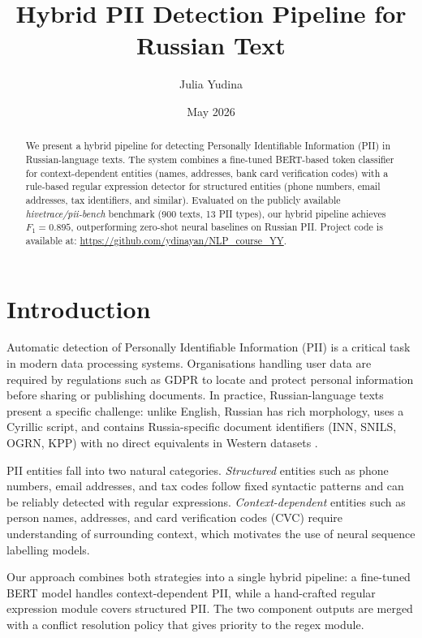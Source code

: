 \documentclass{article}
\title{Hybrid PII Detection Pipeline for Russian Text}
\author{Julia Yudina}
\date{May 2026}
\begin{document}
\maketitle

\begin{abstract}
We present a hybrid pipeline for detecting Personally Identifiable Information (PII) in Russian-language texts. The system combines a fine-tuned BERT-based token classifier for context-dependent entities (names, addresses, bank card verification codes) with a rule-based regular expression detector for structured entities (phone numbers, email addresses, tax identifiers, and similar). Evaluated on the publicly available \textit{hivetrace/pii-bench} benchmark (900 texts, 13 PII types), our hybrid pipeline achieves $F_1 = 0.895$, outperforming zero-shot neural baselines on Russian PII. Project code is available at: \url{https://github.com/ydinayan/NLP_course_YY}.
\end{abstract}

\section{Introduction}

Automatic detection of Personally Identifiable Information (PII) is a critical task in modern data processing systems. Organisations handling user data are required by regulations such as GDPR to locate and protect personal information before sharing or publishing documents. In practice, Russian-language texts present a specific challenge: unlike English, Russian has rich morphology, uses a Cyrillic script, and contains Russia-specific document identifiers (INN, SNILS, OGRN, KPP) with no direct equivalents in Western datasets \cite{ahmed2023survey}.

PII entities fall into two natural categories. \textit{Structured} entities such as phone numbers, email addresses, and tax codes follow fixed syntactic patterns and can be reliably detected with regular expressions. \textit{Context-dependent} entities such as person names, addresses, and card verification codes (CVC) require understanding of surrounding context, which motivates the use of neural sequence labelling models.

Our approach combines both strategies into a single hybrid pipeline: a fine-tuned BERT model handles context-dependent PII, while a hand-crafted regular expression module covers structured PII. The two component outputs are merged with a conflict resolution policy that gives priority to the regex module.
\end{document}
